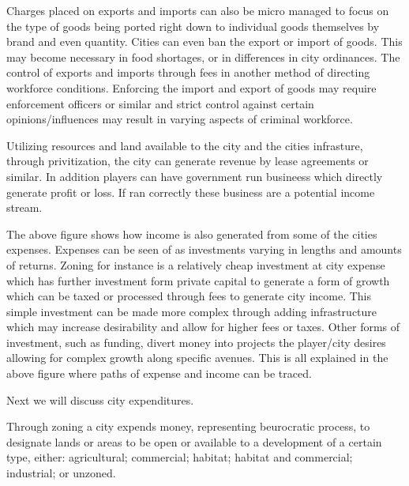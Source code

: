 Charges placed on exports and imports can also be micro managed to focus on the type of goods being ported right down to individual goods themselves by brand and even quantity. Cities can even ban the export or import of goods. This may become necessary in food shortages, or in differences in city ordinances. The control of exports and imports through fees in another method of directing workforce conditions. Enforcing the import and export of goods may require enforcement officers or similar and strict control against certain opinions/influences may result in varying aspects of criminal workforce.


Utilizing resources and land available to the city and the cities infrasture, through privitization, the city can generate revenue by lease agreements or similar. In addition players can have government run busineess which directly generate profit or loss. If ran correctly these business are a potential income stream. 




The above figure shows how income is also generated from some of the cities expenses. Expenses can be seen of as investments varying in lengths and amounts of returns. Zoning for instance is a relatively cheap investment at city expense which has further investment form private capital to generate a form of growth which can be taxed or processed through fees to generate city income. This simple investment can be made more complex through adding infrastructure which may increase desirability and allow for higher fees or taxes. Other forms of investment, such as funding, divert money into projects the player/city desires allowing for complex growth along specific avenues. This is all explained in the above figure where paths of expense and income can be traced.

Next we will discuss city expenditures.

Through zoning a city expends money, representing beurocratic process, to designate lands or areas to be open or available to a development of a certain type, either: agricultural; commercial; habitat; habitat and commercial; industrial; or unzoned.

